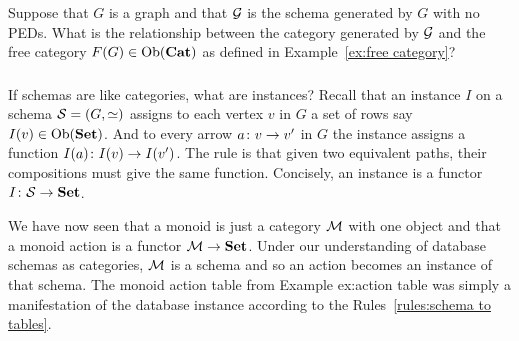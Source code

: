 \documentclass[CT4S-EN-RU]{subfiles}
\begin{document}
\begin{exerciseRUS}
\end{exerciseRUS}

\begin{exerciseENG}
Suppose that $G$ is a graph and that $\mathcal{G}$ is the schema generated by $G$ with no PEDs. What is the relationship between the category generated by $\mathcal{G}$ and the free category $F(G)\in\textnormal{Ob}({\mathbf{Cat}})$ as defined in Example~\ref{ex:free category}?
\end{exerciseENG}

\begin{exerciseRUS}
\end{exerciseRUS}


\subsubsection{}\label{sec:instances}

\begin{blockENG}
If schemas are like categories, what are instances? Recall that an instance $I$ on a schema $\mathcal{S}=(G,\simeq)$ assigns to each vertex $v$ in $G$ a set of rows say $I(v)\in\textnormal{Ob}({\mathbf{Set}})$. And to every arrow $a\colon v\rightarrow v'$ in $G$ the instance assigns a function $I(a)\colon I(v)\rightarrow I(v')$. The rule is that given two equivalent paths, their compositions must give the same function. Concisely, an instance is a functor $I\colon\mathcal{S}\rightarrow{\mathbf{Set}}$. 
\end{blockENG}

\begin{blockRUS}
\end{blockRUS}

\begin{exampleENG}
We have now seen that a monoid is just a category $\mathcal{M}$ with one object and that a monoid action is a functor $\mathcal{M}\rightarrow{\mathbf{Set}}$. Under our understanding of database schemas as categories, $\mathcal{M}$ is a schema and so an action becomes an instance of that schema. The monoid action table from Example {ex:action table} was simply a manifestation of the database instance according to the Rules~\ref{rules:schema to tables}.
\end{exampleENG}

\begin{exampleRUS}
\end{exampleRUS}
\end{document}
